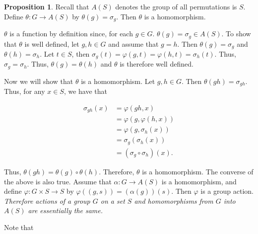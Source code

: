 \documentclass{article}
\makeatletter
\theoremstyle{definition}
\newtheorem{prop}{Proposition}[section]
\theoremstyle{remark}
\let\oldproofname=\proofname
\renewcommand{\proofname}{\bf{\textit{\oldproofname}}}
\theoremstyle{definition}
\renewenvironment{proof}[1][\proofname]{\par
  \pushQED{\qed}%
  \normalfont \topsep6\p@\@plus6\p@\relax
  \list{}{\leftmargin=0mm
          \rightmargin=0mm
          \settowidth{\itemindent}{\itshape#1}%
          \labelwidth=4mm
          \parsep=0pt \listparindent=0mm%
  }
  \item[\hskip\labelsep
        \itshape
    #1\@addpunct{.}]\ignorespaces
}{%
  \popQED\endlist\@endpefalse
}
\makeatother
\begin{document}
    \begin{prop}\label{prop:1.9}
        Recall that $A(S)$ denotes the group of all permutations is $S$. Define $\theta\colon G\rightarrow A(S)$ by $\theta(g)=\sigma_g$. Then $\theta$ is a homomorphism.
    \end{prop}
        \begin{proof}
            $\theta$ is a function by definition since, for each $g\in G$. $\theta(g)=\sigma_g\in A(S)$. To show that $\theta$ is well defined, let $g,h\in G$ and assume that $g=h$. Then $\theta(g)=\sigma_g$ and $\theta(h)=\sigma_h$. Let $t\in S$, then $\sigma_g(t)=\varphi(g,t)=\varphi(h,t)=\sigma_h(t)$. Thus, $\sigma_g=\sigma_h$. Thus, $\theta(g)=\theta(h)$ and $\theta$ is therefore well defined.\par\hspace{4mm} Now we will show that $\theta$ is a homomorphism. Let $g,h\in G$. Then $\theta(gh)=\sigma_{gh}$. Thus, for any $x\in S$, we have that 
            
            \begin{equation*}
                \begin{split}
                    \sigma_{gh}(x) &= \varphi(gh,x) \\
                    &= \varphi(g,\varphi(h,x)) \\
                    &= \varphi(g,\sigma_h(x)) \\
                    &= \sigma_g(\sigma_h(x)) \\
                    &= (\sigma_g\circ\sigma_h)(x).
                \end{split}
            \end{equation*}
            
            Thus, $\theta(gh)=\theta(g)\circ\theta(h)$. Therefore, $\theta$ is a homomorphism. The converse of the above is also true. Assume that $\alpha\colon G\rightarrow A(S)$ is a homomorphism, and define $\varphi\colon G\times S\rightarrow S$ by $\varphi((g,s))=(\alpha(g))(s)$. Then $\varphi$ is a group action. \textit{Therefore actions of a group $G$ on a set $S$ and homomorphisms from $G$ into $A(S)$ are essentially the same.}\par\hspace{4mm} Note that
        \end{proof}
        
\end{document}
